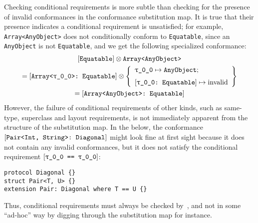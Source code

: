 \documentclass[../generics]{subfiles}
\begin{document}
Checking conditional requirements is more subtle than checking for the presence of invalid conformances in the conformance substitution map. It is true that their presence indicates a conditional requirement is unsatisfied; for example, \texttt{Array<AnyObject>} does not conditionally conform to \texttt{Equatable}, since an \texttt{AnyObject} is not \texttt{Equatable}, and we get the following specialized conformance:
\begin{gather*}
\protosym{Equatable} \otimes \texttt{Array<AnyObject>}\\
= \ConfReq{Array<\ttgp{0}{0}>}{Equatable} \otimes \SubstMapLongC{\SubstType{\ttgp{0}{0}}{AnyObject}}{\ConfReq{\ttgp{0}{0}}{Equatable}\mapsto\text{invalid}}\\
= \ConfReq{Array<AnyObject>}{Equatable}
\end{gather*}
However, the failure of conditional requirements of other kinds, such as same-type, superclass and layout requirements, is not immediately apparent from the structure of the substitution map. In the below, the conformance $[\texttt{Pair<Int, String>:~Diagonal}]$ might look fine at first sight because it does not contain any invalid conformances, but it does not satisfy the conditional requirement $\SameReq{\ttgp{0}{0}}{\ttgp{0}{0}}$:
\begin{Verbatim}
protocol Diagonal {}
struct Pair<T, U> {}
extension Pair: Diagonal where T == U {}
\end{Verbatim}
Thus, conditional requirements must always be checked by~, and not in some ``ad-hoc'' way by digging through the substitution map for instance.
\end{document}
